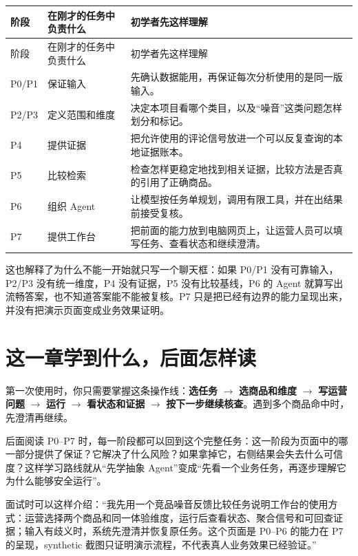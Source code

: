 \begin{longtable}{>{\raggedright\arraybackslash}p{}>{\raggedright\arraybackslash}p{}>{\raggedright\arraybackslash}p{}}
\toprule
阶段 & 在刚才的任务中负责什么 & 初学者先这样理解 \\
\midrule
\endfirsthead
\toprule
阶段 & 在刚才的任务中负责什么 & 初学者先这样理解 \\
\midrule
\endhead
P0/P1 & 保证输入 & 先确认数据能用，再保证每次分析使用的是同一版输入。 \\
P2/P3 & 定义范围和维度 & 决定本项目看哪个类目，以及“噪音”这类问题怎样划分和标记。 \\
P4 & 提供证据 & 把允许使用的评论信号放进一个可以反复查询的本地证据账本。 \\
P5 & 比较检索 & 检查怎样更稳定地找到相关证据，比较方法是否真的引用了正确商品。 \\
P6 & 组织 Agent & 让模型按任务单规划，调用有限工具，并在出结果前接受复核。 \\
P7 & 提供工作台 & 把前面的能力放到电脑网页上，让运营人员可以填写任务、查看状态和继续澄清。 \\
\bottomrule
\end{longtable}

这也解释了为什么不能一开始就只写一个聊天框：如果 P0/P1 没有可靠输入，P2/P3 没有统一维度，P4 没有证据，P5 没有比较基线，P6 的 Agent 就算写出流畅答案，也不知道答案能不能被复核。P7 只是把已经有边界的能力呈现出来，并没有把演示页面变成业务效果证明。

\section{这一章学到什么，后面怎样读}

第一次使用时，你只需要掌握这条操作线：\textbf{选任务} $\rightarrow$ \textbf{选商品和维度} $\rightarrow$ \textbf{写运营问题} $\rightarrow$ \textbf{运行} $\rightarrow$ \textbf{看状态和证据} $\rightarrow$ \textbf{按下一步继续核查}。遇到多个商品命中时，先澄清再继续。

后面阅读 P0--P7 时，每一阶段都可以回到这个完整任务：这一阶段为页面中的哪一部分提供了保证？它解决了什么风险？如果拿掉它，右侧结果会失去什么可信度？这样学习路线就从“先学抽象 Agent”变成“先看一个业务任务，再逐步理解它为什么能够安全运行”。

\begin{interviewbox}
面试时可以这样介绍：“我先用一个竞品噪音反馈比较任务说明工作台的使用方式：运营选择两个商品和同一体验维度，运行后查看状态、聚合信号和可回查证据；输入有歧义时，系统先澄清并恢复原任务。这个页面是 P0--P6 的能力在 P7 的呈现，synthetic 截图只证明演示流程，不代表真人业务效果已经验证。”
\end{interviewbox}
